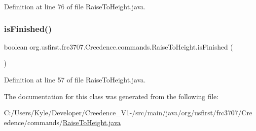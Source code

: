 Definition at line 76 of file Raise\+To\+Height.\+java.

\mbox{\label{classorg_1_1usfirst_1_1frc3707_1_1_creedence_1_1commands_1_1_raise_to_height_ae72d4c6f4c3a965e560f20b2db7c3eb7}} 
\subsubsection{\texorpdfstring{isFinished()}{isFinished()}}
{\footnotesize\ttfamily boolean org.\+usfirst.\+frc3707.\+Creedence.\+commands.\+Raise\+To\+Height.\+is\+Finished (\begin{DoxyParamCaption}{ }\end{DoxyParamCaption})\hspace{0.3cm}{\ttfamily [protected]}}



Definition at line 57 of file Raise\+To\+Height.\+java.



The documentation for this class was generated from the following file\+:\begin{DoxyCompactItemize}
\item 
C\+:/\+Users/\+Kyle/\+Developer/\+Creedence\+\_\+\+V1-\//src/main/java/org/usfirst/frc3707/\+Creedence/commands/\mbox{\hyperlink{_raise_to_height_8java}{Raise\+To\+Height.\+java}}\end{DoxyCompactItemize}
